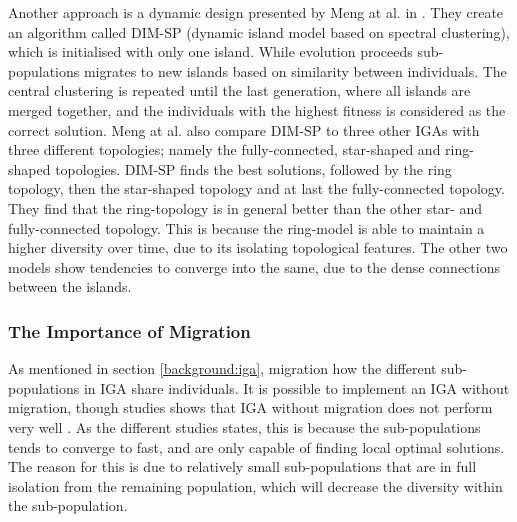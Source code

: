 Another approach is a dynamic design presented by Meng at al. in \cite{IGA:dynamic_im_based_on_spectral_clustering_in_ga}. They create an algorithm called DIM-SP (dynamic island model based on spectral clustering), which is initialised with only one island. While evolution proceeds sub-populations migrates to new islands based on similarity between individuals. The central clustering is repeated until the last generation, where all islands are merged together, and the individuals with the highest fitness is considered as the correct solution. Meng at al. also compare DIM-SP to three other IGAs with three different topologies; namely the fully-connected, star-shaped and ring-shaped topologies. DIM-SP finds the best solutions, followed by the ring topology, then the star-shaped topology and at last the fully-connected topology. They find that the ring-topology is in general better than the other star- and fully-connected topology. This is because the ring-model is able to maintain a higher diversity over time, due to its isolating topological features. The other two models show tendencies to converge into the same, due to the dense connections between the islands.

\subsubsection{The Importance of Migration}

As mentioned in section \ref{background:iga}, migration how the different sub-populations in IGA share individuals. It is possible to implement an IGA without migration, though studies shows that IGA without migration does not perform very well \cite{IGA:attribute-reduction, IGA:Corcoran, IGA:DGA-optimization-of-wind-farm}. As the different studies states, this is because the sub-populations tends to converge to fast, and are only capable of finding local optimal solutions. The reason for this is due to relatively small sub-populations that are in full isolation from the remaining population, which will decrease the diversity within the sub-population. 

